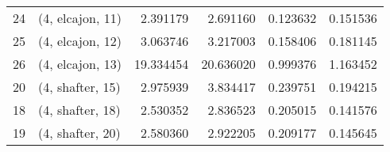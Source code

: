 \begin{tabular}{llrrrr}
24 &  (4, elcajon, 11) &   2.391179 &   2.691160 &   0.123632 &  0.151536 \\
25 &  (4, elcajon, 12) &   3.063746 &   3.217003 &   0.158406 &  0.181145 \\
26 &  (4, elcajon, 13) &  19.334454 &  20.636020 &   0.999376 &  1.163452 \\
20 &  (4, shafter, 15) &   2.975939 &   3.834417 &   0.239751 &  0.194215 \\
18 &  (4, shafter, 18) &   2.530352 &   2.836523 &   0.205015 &  0.141576 \\
19 &  (4, shafter, 20) &   2.580360 &   2.922205 &   0.209177 &  0.145645 \\
\bottomrule
\end{tabular}
